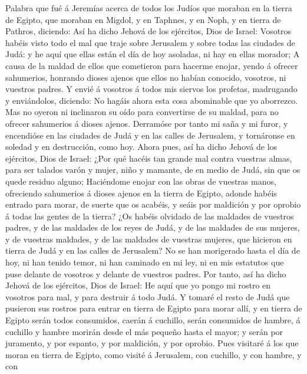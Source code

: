  Palabra que fué á Jeremías acerca de todos los Judíos que
moraban en la tierra de Egipto, que moraban en Migdol, y en Taphnes, y
en Noph, y en tierra de Pathros, diciendo:  Así ha dicho
Jehová de los ejércitos, Dios de Israel: Vosotros habéis visto todo el
mal que traje sobre Jerusalem y sobre todas las ciudades de Judá: y he
aquí que ellas están el día de hoy asoladas, ni hay en ellas morador;
 A causa de la maldad de ellos que cometieron para hacerme
enojar, yendo á ofrecer sahumerios, honrando dioses ajenos que ellos no
habían conocido, vosotros, ni vuestros padres.  Y envié á
vosotros á todos mis siervos los profetas, madrugando y enviándolos,
diciendo: No hagáis ahora esta cosa abominable que yo aborrezco.
 Mas no oyeron ni inclinaron su oído para convertirse de
su maldad, para no ofrecer sahumerios á dioses ajenos. 
Derramóse por tanto mi saña y mi furor, y encendióse en las ciudades de
Judá y en las calles de Jerusalem, y tornáronse en soledad y en
destrucción, como hoy.  Ahora pues, así ha dicho Jehová de
los ejércitos, Dios de Israel: ¿Por qué hacéis tan grande mal contra
vuestras almas, para ser talados varón y mujer, niño y mamante, de en
medio de Judá, sin que os quede residuo alguno; 
Haciéndome enojar con las obras de vuestras manos, ofreciendo sahumerios
á dioses ajenos en la tierra de Egipto, adonde habéis entrado para
morar, de suerte que os acabéis, y seáis por maldición y por oprobio á
todas las gentes de la tierra?  ¿Os habéis olvidado de las
maldades de vuestros padres, y de las maldades de los reyes de Judá, y
de las maldades de sus mujeres, y de vuestras maldades, y de las
maldades de vuestras mujeres, que hicieron en tierra de Judá y en las
calles de Jerusalem?  No se han morigerado hasta el día
de hoy, ni han tenido temor, ni han caminado en mi ley, ni en mis
estatutos que puse delante de vosotros y delante de vuestros padres.
 Por tanto, así ha dicho Jehová de los ejércitos, Dios de
Israel: He aquí que yo pongo mi rostro en vosotros para mal, y para
destruir á todo Judá.  Y tomaré el resto de Judá que
pusieron sus rostros para entrar en tierra de Egipto para morar allí, y
en tierra de Egipto serán todos consumidos, caerán á cuchillo, serán
consumidos de hambre, á cuchillo y hambre morirán desde el más pequeño
hasta el mayor; y serán por juramento, y por espanto, y por maldición, y
por oprobio.  Pues visitaré á los que moran en tierra de
Egipto, como visité á Jerusalem, con cuchillo, y con hambre, y con
